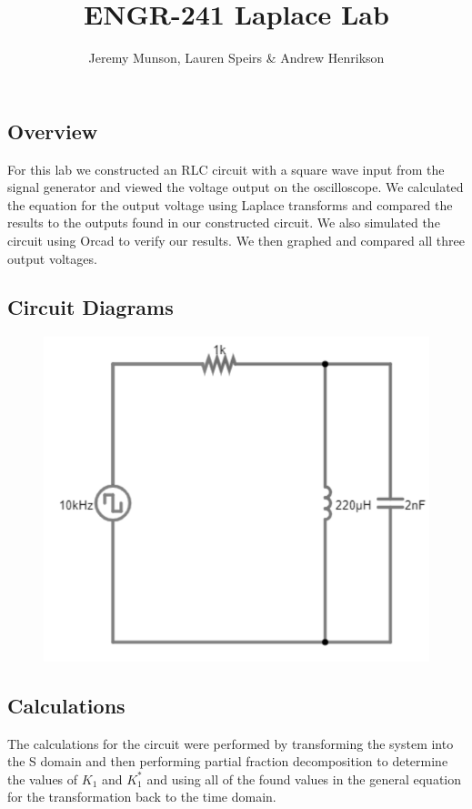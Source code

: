 \documentclass[11pt]{article}
\title{ENGR-241 Laplace Lab}
\author{Jeremy Munson, Lauren Speirs \& Andrew Henrikson}
\begin{document}
	\maketitle
	\subsection*{Overview}
	For this lab we constructed an RLC circuit with a square wave input from the signal generator and viewed the voltage output on the oscilloscope. We calculated the equation for the output voltage using  Laplace transforms and compared the results to the outputs found in our constructed circuit. We also simulated the circuit using Orcad to verify our results. We then graphed and compared all three output voltages.
	\subsection*{Circuit Diagrams}
	
	\begin{figure}[H]
	\centering
	\includegraphics[width=5in]{images/basic diagram.png}
	\end{figure}
		
	\subsection*{Calculations}
	The calculations for the circuit were performed by transforming the system into the S domain and then performing partial fraction decomposition to determine the values of $K_{1}$ and $K^{*}_{1}$ and using all of the found values in the general equation for the transformation back to the time domain.
\end{document}
